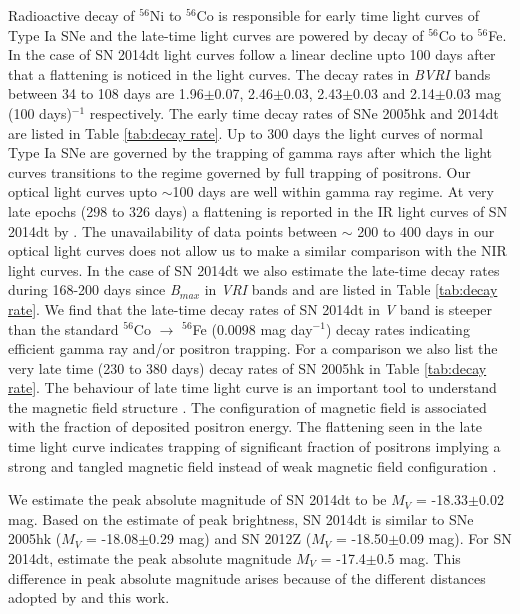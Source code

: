 \documentclass[fleqn,usenatbib]{mnras}
\begin{document}
Radioactive decay of $^{56}$Ni to $^{56}$Co is responsible for early time light curves of Type Ia SNe and the late-time light curves are powered by decay of $^{56}$Co to $^{56}$Fe. In the case of SN 2014dt light curves follow a linear decline upto 100 days after that a flattening is noticed in the light curves. The decay rates in {\it BVRI} bands between 34 to 108 days are 1.96$\pm$0.07, 2.46$\pm$0.03, 2.43$\pm$0.03 and 2.14$\pm$0.03 mag (100 days)$^{-1}$ respectively. The early time decay rates of SNe 2005hk and 2014dt are listed in Table \ref{tab:decay rate}. Up to 300 days the light curves of normal Type Ia SNe are governed by the trapping of gamma rays after which the light curves transitions to the regime governed by full trapping of positrons. Our optical light curves upto $\sim$100 days are well within gamma ray regime. At very late epochs (298 to 326 days) a flattening is reported in the IR light curves of SN 2014dt by \cite{2016ApJ...816L..13F}. The unavailability of data points between $\sim$ 200 to 400 days in our optical light curves does not allow us to make a similar comparison with the NIR light curves. In the case of SN 2014dt we also estimate the late-time decay rates during 168-200 days since {\it B}$_{max}$ in {\it VRI} bands and are listed in Table \ref{tab:decay rate}. We find that the late-time decay rates of SN 2014dt in {\it V} band is steeper than the standard $^{56}$Co $\rightarrow$ $^{56}$Fe (0.0098 mag day$^{-1}$) decay rates indicating efficient gamma ray and/or positron trapping. For a comparison we also list the very late time (230 to 380 days) decay rates of SN 2005hk in Table \ref{tab:decay rate}. The behaviour of late time light curve is an important tool to understand the magnetic field structure \citep{1980ApJ...237L..81C,1998ApJ...500..360R, 1999ApJS..124..503M,2001ApJ...559.1019M}. The configuration of magnetic field is associated with the fraction of deposited positron energy. The flattening seen in the late time light curve indicates trapping of significant fraction of positrons implying a strong and tangled magnetic field instead of weak magnetic field configuration \citep{2007A&A...470L...1S}.


We estimate the peak absolute magnitude of SN 2014dt to be $M$$_V$ = -18.33$\pm$0.02 mag. Based on the estimate of peak brightness, SN 2014dt is similar to SNe 2005hk \citep{2007PASP..119..360P} ($M$$_V$ = -18.08$\pm$0.29 mag) and SN 2012Z \citep{2015A&A...573A...2S} ($M$$_V$ = -18.50$\pm$0.09 mag). For SN 2014dt, \cite{2016MNRAS.461..433F} estimate  the peak absolute magnitude $M$$_V$ = -17.4$\pm$0.5 mag. This difference in peak absolute magnitude arises because of the different distances adopted by \cite{2015ApJ...798L..37F} and this work. 
\end{document}

